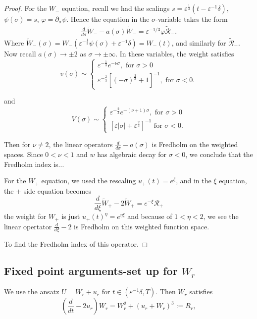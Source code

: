 \documentclass[letterpaper,11pt]{article}
\newcommand{\eps}{\varepsilon}
\numberwithin{equation}{section}
\theoremstyle{plain}
\begin{document}
\begin{proof}
For the $W_-$ equation, recall we had the  scalings $s = \eps^{\frac{1}{3}}(t-\eps^{-1}\delta) $, $\psi(\sigma) =s $, $\varphi = \partial_\sigma \psi$. Hence the equation in the $\sigma$-variable takes the form
\begin{align*}
\frac{d}{d\sigma} \tilde{W}_- -a(\sigma)\tilde{W}_- = \eps^{-1/3}\varphi \tilde{\mathcal{R}}_-.
\end{align*}
Where $\tilde{W}_-(\sigma) = W_-(\eps^{-\frac{1}{3}} \psi(\sigma)+\eps^{-1}\delta)=W_-(t)$, and similarly for $\tilde{\mathcal{R}}_-$. Now recall $a(\sigma) \to \pm 2 $ as $\sigma \to \pm \infty$. In these variables, the weight satisfies 
\[
v(\sigma) \sim \begin{cases}
 \eps^{-\frac{1}{3}} e^{-\nu \sigma},  \text{ for }\sigma >0 \\
\eps^{-\frac{2}{3}}[(-\sigma)^{\frac{2}{3}}+1]^{-1}, \text{ for }\sigma < 0.
\end{cases}
\]

and 
\[
V(\sigma) \sim \begin{cases}
 \eps^{-\frac{2}{3}} e^{-(\nu+1)\sigma},  \text{ for }\sigma >0 \\
[\eps |\sigma|+\eps^{\frac{2}{3}}]^{-1} \text{ for }\sigma < 0.
\end{cases}
\]

Then for $\nu \neq 2$, the linear operators $\frac{d}{d\sigma} -a(\sigma)$ is Fredholm on the weighted spaces.  Since $0 < \nu < 1$ and $w$ has algebraic decay for $\sigma<0$, we conclude that the Fredholm index is...

For the $W_+$ equation, we used the rescaling $u_+(t)  = e^\xi$, and in the $\xi$ equation, the $+$ side equation becomes
\[
\frac{d}{d\xi}\tilde{W}_+ -2\tilde{W}_+ = e^{-\xi}\mathcal{R}_+
\]
the weight for $W_+$ is just $u_+(t)^{\eta}=e^{\eta \xi}$ and because of $1<\eta<2$, we see the linear opertator $\frac{d}{d\xi}-2$ is Fredholm on this weighted function space.

To find the Fredholm index of this operator.
\end{proof}
\pagebreak

\subsection{Fixed point arguments-set up for \texorpdfstring{$W_{r}$}{Wright}}

We use the ansatz $U = W_r + u_r$ for $t \in  (\eps^{-1}\delta, T)$. Then $W_r$ satisfies
\begin{equation}\label{Wreqn}
\left(\frac{d}{dt} - 2u_r \right)W_r = W_r^2+(u_r+W_r)^3 := R_r,
\end{equation}
\end{document}
